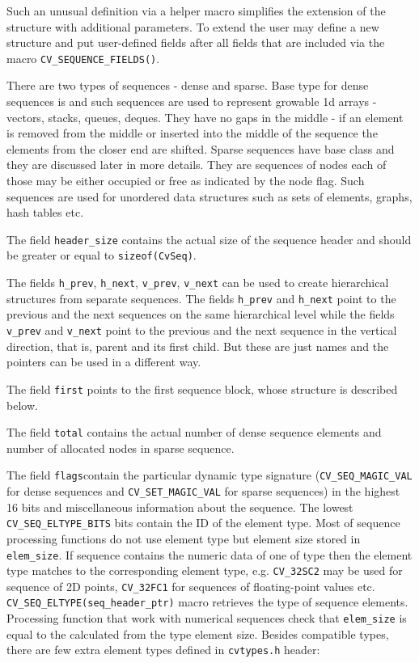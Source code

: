 Such an unusual definition via a helper macro simplifies the extension
of the structure  with additional parameters. To extend
 the user may define a new structure and put user-defined
fields after all  fields that are included via the macro
\texttt{CV\_SEQUENCE\_FIELDS()}.

There are two types of sequences - dense and sparse. Base type for dense
sequences is  and such sequences are used to represent
growable 1d arrays - vectors, stacks, queues, deques. They have no gaps
in the middle - if an element is removed from the middle or inserted
into the middle of the sequence the elements from the closer end are
shifted. Sparse sequences have  base class and they are
discussed later in more details. They are sequences of nodes each of
those may be either occupied or free as indicated by the node flag. Such
sequences are used for unordered data structures such as sets of elements,
graphs, hash tables etc.

The field \texttt{header\_size} contains the actual size of the sequence
header and should be greater or equal to \texttt{sizeof(CvSeq)}.

The fields
\texttt{h\_prev}, \texttt{h\_next}, \texttt{v\_prev}, \texttt{v\_next}
can be used to create hierarchical structures from separate sequences. The
fields \texttt{h\_prev} and \texttt{h\_next} point to the previous and
the next sequences on the same hierarchical level while the fields
\texttt{v\_prev} and \texttt{v\_next} point to the previous and the
next sequence in the vertical direction, that is, parent and its first
child. But these are just names and the pointers can be used in a
different way.

The field \texttt{first} points to the first sequence block, whose structure is described below.

The field \texttt{total} contains the actual number of dense sequence elements and number of allocated nodes in sparse sequence.

The field \texttt{flags}contain the particular dynamic type
signature (\texttt{CV\_SEQ\_MAGIC\_VAL} for dense sequences and
\texttt{CV\_SET\_MAGIC\_VAL} for sparse sequences) in the highest 16
bits and miscellaneous information about the sequence. The lowest
\texttt{CV\_SEQ\_ELTYPE\_BITS} bits contain the ID of the element
type. Most of sequence processing functions do not use element type but
element size stored in \texttt{elem\_size}. If sequence contains the
numeric data of one of  type then the element type matches
to the corresponding  element type, e.g. \texttt{CV\_32SC2} may be
used for sequence of 2D points, \texttt{CV\_32FC1} for sequences of floating-point
values etc. \texttt{CV\_SEQ\_ELTYPE(seq\_header\_ptr)} macro retrieves the
type of sequence elements. Processing function that work with numerical
sequences check that \texttt{elem\_size} is equal to the calculated from
the type element size. Besides  compatible types, there
are few extra element types defined in \texttt{cvtypes.h} header:

